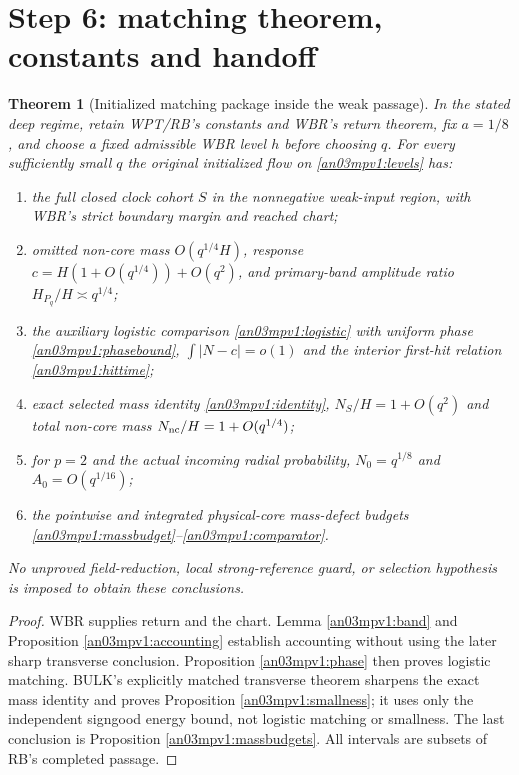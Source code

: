 \documentclass[11pt]{article}
\numberwithin{equation}{section}
\newtheorem{theorem}{Theorem}[section]
\theoremstyle{remark}\newtheorem{remark}[theorem]{Remark}
\begin{document}
\section{Step 6: matching theorem, constants and handoff}
\begin{theorem}[Initialized matching package inside the weak passage]
\label{an03mpv1:main}
In the stated deep regime, retain WPT/RB's constants and WBR's
return theorem, fix $a=1/8$, and choose a fixed admissible WBR level
$h$ before choosing $q$. For every sufficiently small $q$ the
original initialized flow on \eqref{an03mpv1:levels} has:
\begin{enumerate}
 \item the full closed clock cohort $S$ in the nonnegative weak-input
 region, with WBR's strict boundary margin and reached chart;
 \item omitted non-core mass $O(q^{1/4}H)$, response
 $c=H(1+O(q^{1/4}))+O(q^2)$, and primary-band amplitude ratio
 $H_{P_q}/H\asymp q^{1/4}$;
 \item the auxiliary logistic comparison \eqref{an03mpv1:logistic}
 with uniform phase \eqref{an03mpv1:phasebound},
 $\int|N-c|=o(1)$ and the interior first-hit relation
 \eqref{an03mpv1:hittime};
 \item exact selected mass identity \eqref{an03mpv1:identity},
 $N_S/H=1+O(q^2)$ and total non-core mass
 $N_{\rm nc}/H=1+O(q^{1/4})$;
 \item for $p=2$ and the actual incoming radial probability,
 $N_0=q^{1/8}$ and $A_0=O(q^{1/16})$;
 \item the pointwise and integrated physical-core mass-defect
 budgets \eqref{an03mpv1:massbudget}--\eqref{an03mpv1:comparator}.
\end{enumerate}
No unproved field-reduction, local strong-reference guard, or
selection hypothesis is imposed to obtain these conclusions.
\end{theorem}
\begin{proof}
WBR supplies return and the chart. Lemma \ref{an03mpv1:band} and
Proposition \ref{an03mpv1:accounting} establish accounting without
using the later sharp transverse conclusion. Proposition
\ref{an03mpv1:phase} then proves logistic matching. BULK's explicitly
matched transverse theorem sharpens the exact mass identity and
proves Proposition \ref{an03mpv1:smallness}; it uses only the
independent signgood energy bound, not logistic matching or smallness.
The last conclusion is Proposition \ref{an03mpv1:massbudgets}.
All intervals are subsets of RB's completed passage.
\end{proof}
\end{document}
